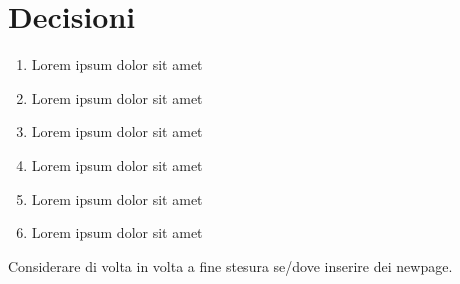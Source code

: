 \documentclass[a4paper,12pt]{article}
\begin{document}
\section{Decisioni}
\begin{enumerate}[noitemsep]
    \item Lorem ipsum dolor sit amet
    \item Lorem ipsum dolor sit amet
    \item Lorem ipsum dolor sit amet
    \item Lorem ipsum dolor sit amet
    \item Lorem ipsum dolor sit amet
    \item Lorem ipsum dolor sit amet
\end{enumerate}

\vspace{2cm}

\begin{infobox}
Considerare di volta in volta a fine stesura se/dove inserire dei newpage.
\end{infobox}
\end{document}
